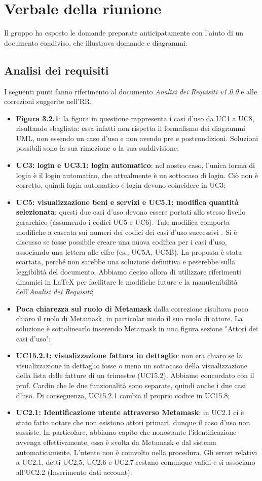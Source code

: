 \section{Verbale della riunione}
Il gruppo ha esposto le domande preparate anticipatamente con l'aiuto di un 
documento condiviso, che illustrava domande e diagrammi.

\subsection{Analisi dei requisiti}
I seguenti punti fanno riferimento al documento \textit{Analisi dei Requisiti v1.0.0} e alle correzioni suggerite nell'RR.
\begin{itemize}
	\item \textbf{Figura 3.2.1}: la figura in questione rappresenta i casi d'uso da UC1 a UC8, risultando sbagliata: essa infatti non rispetta il formalismo dei diagrammi UML, non essendo un caso d'uso e non avendo pre e postcondizioni. Soluzioni possibili sono la sua rimozione o la sua suddivisione;
	\item \textbf{UC3: login e UC3.1: login automatico}: nel nostro caso, l'unica forma di login è il login automatico, che attualmente è un sottocaso di login. Ciò non è corretto, quindi login automatico e login devono coincidere in UC3;
	\item \textbf{UC5: visualizzazione beni e servizi e UC5.1: modifica quantità selezionata}: questi due casi d'uso devono essere portati allo stesso livello gerarchico (assumendo i codici UC5 e UC6). Tale modifica comporta modifiche a cascata sui numeri dei codici dei casi d'uso successivi . Si è discusso se fosse possibile creare una nuova codifica per i casi d'uso, associando una lettera alle cifre (es.: UC5A, UC5B). La proposta è stata scartata, perché non sarebbe una soluzione definitiva e peserebbe sulla leggibilità del documento. Abbiamo deciso allora di utilizzare riferimenti dinamici in \LaTeX{} per facilitare le modifiche future e la manutenibilità dell'\textit{Analisi dei Requisiti};
	\item \textbf{Poca chiarezza sul ruolo di Metamask} dalla correzione risultava poco chiaro il ruolo di Metamask, in particolar modo il suo ruolo di attore. La soluzione è sottolinearlo inserendo Metamask in una figura sezione "Attori dei casi d'uso";
	\item \textbf{UC15.2.1: visualizzazione fattura in dettaglio}: non era chiaro se la visualizzazione in dettaglio fosse o meno un sottocaso della visualizzazione della lista delle fatture di un trimestre (UC15.2). Abbiamo concordato con il prof. Cardin che le due funzionalità sono separate, quindi anche i due casi d'uso. Di conseguenza, UC15.2.1 cambia il proprio codice in UC15.8;
	\item \textbf{UC2.1: Identificazione utente attraverso Metamask}: in UC2.1 ci è stato fatto notare che non esistono attori primari, dunque il caso d'uso non sussiste. In particolare, abbiamo capito che nonostante l'identificazione avvenga effettivamente, essa è svolta da Metamask e dal sistema automaticamente. L'utente non è coinvolto nella procedura. Gli errori relativi a UC2.1, detti UC2.5, UC2.6 e UC2.7 restano comunque validi e si associano all'UC2.2 (Inserimento dati account).
	

\end{itemize}
